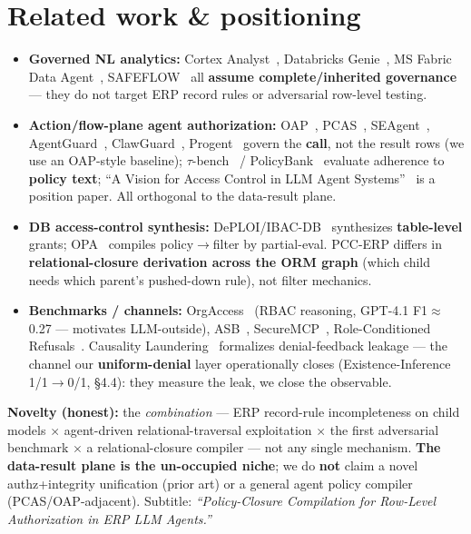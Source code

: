\documentclass[runningheads]{llncs}
\begin{document}
\section{Related work \& positioning}
\begin{itemize}[leftmargin=*,itemsep=1pt]
  \item \textbf{Governed NL analytics:} Cortex Analyst~\cite{cortexanalyst}, Databricks Genie~\cite{databricksgenie},
        MS Fabric Data Agent~\cite{fabricdataagent}, SAFEFLOW~\cite{safeflow} all \textbf{assume complete/inherited
        governance} --- they do not target ERP record rules or adversarial row-level testing.
  \item \textbf{Action/flow-plane agent authorization:} OAP~\cite{oap}, PCAS~\cite{pcas}, SEAgent~\cite{seagent},
        AgentGuard~\cite{agentguard}, ClawGuard~\cite{clawguard}, Progent~\cite{progent} govern the \textbf{call},
        not the result rows (we use an OAP-style baseline); $\tau$-bench~\cite{taubench} /
        PolicyBank~\cite{policybank} evaluate adherence to \textbf{policy text}; ``A Vision for Access Control in
        LLM Agent Systems''~\cite{visionaac} is a position paper. All orthogonal to the data-result plane.
  \item \textbf{DB access-control synthesis:} DePLOI/IBAC-DB~\cite{deploi} synthesizes \textbf{table-level} grants;
        OPA~\cite{opa} compiles policy$\to$filter by partial-eval. PCC-ERP differs in \textbf{relational-closure
        derivation across the ORM graph} (which child needs which parent's pushed-down rule), not filter mechanics.
  \item \textbf{Benchmarks / channels:} OrgAccess~\cite{orgaccess} (RBAC reasoning, GPT-4.1 F1$\approx$0.27 ---
        motivates LLM-outside), ASB~\cite{asb}, SecureMCP~\cite{securemcp}, Role-Conditioned
        Refusals~\cite{rolecond}. Causality Laundering~\cite{causalitylaundering} formalizes denial-feedback
        leakage --- the channel our \textbf{uniform-denial} layer operationally closes (Existence-Inference
        1/1$\to$0/1, \S4.4): they measure the leak, we close the observable.
\end{itemize}

\textbf{Novelty (honest):} the \emph{combination} --- ERP record-rule incompleteness on child models $\times$
agent-driven relational-traversal exploitation $\times$ the first adversarial benchmark $\times$ a
relational-closure compiler --- not any single mechanism. \textbf{The data-result plane is the un-occupied niche};
we do \textbf{not} claim a novel authz+integrity unification (prior art) or a general agent policy compiler
(PCAS/OAP-adjacent). Subtitle: \emph{``Policy-Closure Compilation for Row-Level Authorization in ERP LLM Agents.''}
\end{document}

